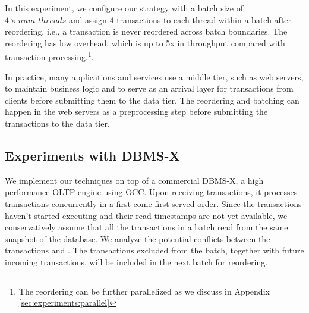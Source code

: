 {In this experiment, we configure our strategy with a batch size of $4\times num\_threads$ and assign $4$ transactions to each thread within a batch after reordering, i.e., a transaction is never reordered across batch boundaries. The reordering has low overhead, which is up to 5x in throughput compared with transaction processing.\footnote{The reordering can be further parallelized as we discuss in Appendix \ref{sec:experiments:parallel}}.

In practice, many applications and services use a middle tier, such as web servers, to maintain business logic and to serve as an arrival layer for transactions from clients before submitting them to the data tier. The reordering and batching can happen in the web servers as a preprocessing step before submitting the transactions to the data tier.
}

\subsection{Experiments with DBMS-X}
\label{subsec:experiment:compare}

We implement our techniques on top of a commercial DBMS-X, a high performance OLTP engine using OCC. Upon receiving transactions, it processes transactions concurrently in a first-come-first-served order.
 Since the transactions haven't started executing and their read timestamps are not yet available, we conservatively assume that all the transactions in a batch read from the same snapshot of the database. We analyze the potential conflicts between the transactions and . The transactions excluded from the batch, together with future incoming transactions, will be included in the next batch for reordering.


